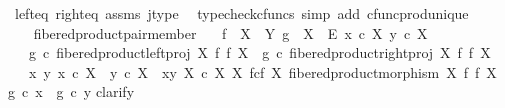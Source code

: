 \begin{isabellebody}
\ left{\isacharunderscore}{\kern0pt}eq\ right{\isacharunderscore}{\kern0pt}eq\ assms\ j{\isacharunderscore}{\kern0pt}type\ \isamarkupfalse%
\ {\isacharparenleft}{\kern0pt}typecheck{\isacharunderscore}{\kern0pt}cfuncs{\isacharcomma}{\kern0pt}\ simp\ add{\isacharcolon}{\kern0pt}\ cfunc{\isacharunderscore}{\kern0pt}prod{\isacharunderscore}{\kern0pt}unique{\isacharparenright}{\kern0pt}\isanewline
\ \ \ \ \isamarkupfalse%
\isanewline
\ \ \isamarkupfalse%
\isanewline
{}\isamarkupfalse%
%
\endisatagproof
{\isafoldproof}%
%
\isadelimproof
\isanewline
%
\endisadelimproof
\isanewline
{}\isamarkupfalse%
\ fibered{\isacharunderscore}{\kern0pt}product{\isacharunderscore}{\kern0pt}pair{\isacharunderscore}{\kern0pt}member{}{\isacharcolon}{\kern0pt}\isanewline
\ \ \ {\isachardoublequoteopen}f\ {\isacharcolon}{\kern0pt}\ X\ {\isasymrightarrow}\ Y{\isachardoublequoteclose}\ {\isachardoublequoteopen}g\ {\isacharcolon}{\kern0pt}\ X\ {\isasymrightarrow}\ E{\isachardoublequoteclose}\ {\isachardoublequoteopen}x\ {\isasymin}\isactrlsub c\ X{\isachardoublequoteclose}\ {\isachardoublequoteopen}y\ {\isasymin}\isactrlsub c\ X{\isachardoublequoteclose}\isanewline
\ \ \ {\isachardoublequoteopen}g\ {\isasymcirc}\isactrlsub c\ fibered{\isacharunderscore}{\kern0pt}product{\isacharunderscore}{\kern0pt}left{\isacharunderscore}{\kern0pt}proj\ X\ f\ f\ X\ {\isacharequal}{\kern0pt}\ g\ {\isasymcirc}\isactrlsub c\ fibered{\isacharunderscore}{\kern0pt}product{\isacharunderscore}{\kern0pt}right{\isacharunderscore}{\kern0pt}proj\ X\ f\ f\ X{\isachardoublequoteclose}\isanewline
\ \ \ {\isachardoublequoteopen}{\isasymforall}x\ y{\isachardot}{\kern0pt}\ x\ {\isasymin}\isactrlsub c\ X\ {\isasymlongrightarrow}\ y\ {\isasymin}\isactrlsub c\ X\ {\isasymlongrightarrow}\ {\isasymlangle}x{\isacharcomma}{\kern0pt}y{\isasymrangle}\ {\isasymin}\isactrlbsub X\ {\isasymtimes}\isactrlsub c\ X\isactrlesub \ {\isacharparenleft}{\kern0pt}X\ \isactrlbsub f\isactrlesub {\isasymtimes}\isactrlsub c\isactrlbsub f\isactrlesub \ X{\isacharcomma}{\kern0pt}\ fibered{\isacharunderscore}{\kern0pt}product{\isacharunderscore}{\kern0pt}morphism\ X\ f\ f\ X{\isacharparenright}{\kern0pt}\ {\isasymlongrightarrow}\ g\ {\isasymcirc}\isactrlsub c\ x\ {\isacharequal}{\kern0pt}\ g\ {\isasymcirc}\isactrlsub c\ y{\isachardoublequoteclose}\isanewline
%
\isadelimproof
%
\endisadelimproof
%
\isatagproof
{}\isamarkupfalse%
{\isacharparenleft}{\kern0pt}clarify{\isacharparenright}{\kern0pt}\isanewline

\end{isabellebody}
